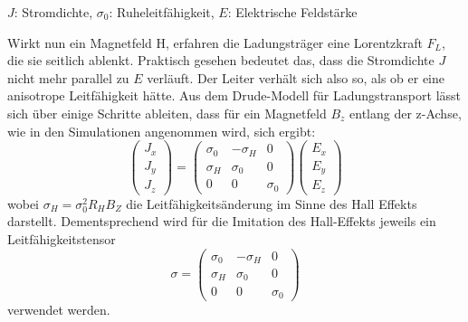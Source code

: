 \documentclass[12pt, a4paper]{article}
\renewcommand{\footnotesize}{\fontsize{10pt}{12pt}\selectfont}
\begin{document}
\vspace{-0.8em}
\begin{center}
	\footnotesize
	$J$: Stromdichte, $\sigma_0$: Ruheleitfähigkeit, $E$: Elektrische Feldstärke
\end{center}

Wirkt nun ein Magnetfeld H, erfahren die Ladungsträger eine Lorentzkraft $F_L$, die sie seitlich ablenkt. Praktisch gesehen bedeutet das, dass die Stromdichte $J$ nicht mehr parallel zu $E$ verläuft. Der Leiter verhält sich also so, als ob er eine anisotrope Leitfähigkeit hätte.\newline
Aus dem Drude-Modell für Ladungstransport lässt sich über einige Schritte ableiten, dass für ein Magnetfeld $B_z$ entlang der z-Achse, wie in den Simulationen angenommen wird, sich ergibt:
\begin{equation}
	\begin{pmatrix} J_x \\ J_y \\ J_z \end{pmatrix}=\begin{pmatrix} \sigma_0 & -\sigma_H & 0 \\ \sigma_H & \sigma_0 & 0 \\ 0 & 0 & \sigma_0\end{pmatrix} \begin{pmatrix} E_x \\ E_y \\ E_z \end{pmatrix}
	\tag{4.10}
	\label{4.10}
\end{equation}
wobei $\sigma_H=\sigma_0^2R_HB_Z$ die Leitfähigkeitsänderung im Sinne des Hall Effekts darstellt.\newline%
Dementsprechend wird für die Imitation des Hall-Effekts jeweils ein Leitfähigkeitstensor 
\begin{equation}
	\sigma=\begin{pmatrix} \sigma_0 & -\sigma_H & 0 \\ \sigma_H & \sigma_0 & 0 \\ 0 & 0 & \sigma_0\end{pmatrix}
	\tag{4.11}
	\label{4.11}
\end{equation}
verwendet werden.
\end{document}

